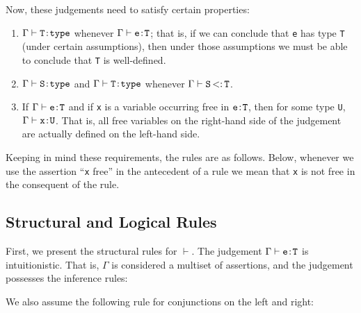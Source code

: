 \documentclass[preprint,nocopyrightspace,9pt]{sigplanconf}
\begin{document}
{Now, these judgements need to satisfy certain properties:

\begin{enumerate}

\item
    $\Gamma \vdash {\tt T} \ty {\tt type}$
whenever 
      $\Gamma \vdash {\tt e} \ty {\tt T}$; that is,
if we can conclude that {\tt e}
      has type {\tt T} (under certain assumptions), then under those
      assumptions we must be able to conclude that {\tt T} is well-defined.

\item
    $\Gamma \vdash {\tt S} \ty {\tt type}$ and
    $\Gamma \vdash {\tt T} \ty {\tt type}$ whenever
      $\Gamma \vdash {\tt S} \subtype {\tt T}$.

\item
If 
      $\Gamma \vdash {\tt e} \ty {\tt T}$ and if {\tt x}
is a variable occurring free in ${\tt e} \ty {\tt T}$, then for some
      type {\tt U},
      $\Gamma \vdash {\tt x} \ty {\tt U}$.
That is, all free variables on the right-hand
      side of the judgement are actually defined on the left-hand side.
\end{enumerate}


Keeping in mind these requirements, the rules are as follows. Below,
whenever we use the assertion ``{\tt x} free'' in the antecedent of
a rule we mean
that {\tt x} is not free in the consequent of the rule.


\subsection{
      Structural and Logical Rules
}


First, we present the structural rules for $\vdash$. The judgement
$\Gamma\vdash {\tt e} \ty {\tt T}$ is
intuitionistic. That is, $\Gamma$ is considered a multiset of assertions, and
the judgement possesses the inference rules:






We also assume the following rule for conjunctions on the left and right:

}
\end{document}
